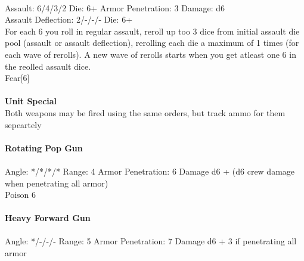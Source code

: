 \ \\
Assault: 6/4/3/2 Die: 6+ Armor Penetration: 3 Damage: d6 \\
Assault Deflection: 2/-/-/- Die: 6+\\
\indent For each 6 you roll in regular assault, reroll up too 3 dice from initial assault die pool (assault or assault deflection), rerolling each die a maximum of 1 times (for each wave of rerolls). A new wave of rerolls starts when you get atleast one 6 in the reolled assault dice.\\ Fear[6] \\
\ \\

{\bf Unit Special} \\
Both weapons may be fired using the same orders, but track ammo for them sepeartely
\ \\
\ \\
{\bf Rotating Pop Gun } \\
\ \\
Angle: */*/*/* Range: 4 Armor Penetration: 6 Damage d6 + (d6 crew damage when penetrating all armor) \\
\indent Poison 6 \\



\ \\
{\bf Heavy Forward Gun } \\
\ \\
Angle: */-/-/- Range: 5 Armor Penetration: 7 Damage d6 + 3 if penetrating all armor \\
\indent  \\





